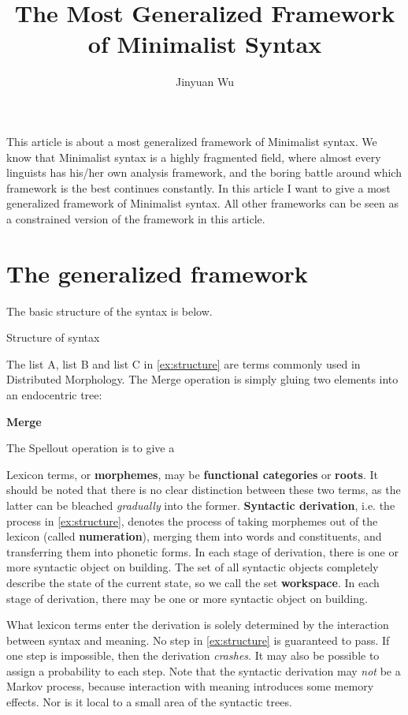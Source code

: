 \documentclass[a4paper]{article}
\title{The Most Generalized Framework of Minimalist Syntax}
\author{Jinyuan Wu}
\newcommand*{\concept}[1]{{\textbf{#1}}}
\begin{document}
\maketitle

This article is about a most generalized framework of Minimalist syntax. We know that Minimalist syntax 
is a highly fragmented field, where almost every linguists has his/her own analysis
framework, and the boring battle around which framework is the best continues constantly.
In this article I want to give a most generalized framework of Minimalist syntax. All other
frameworks can be seen as a constrained version of the framework in this article.

\section{The generalized framework}

The basic structure of the syntax is below.
\begin{exe}
    \ex\label{ex:structure} Structure of syntax 
    
\end{exe}
The list A, list B and list C in \eqref{ex:structure} are terms commonly used in Distributed Morphology.
The Merge operation is simply gluing two elements into an endocentric tree:
\begin{exe}
    \ex\label{ex:merge} \concept{Merge} 
    
\end{exe}
The Spellout operation is to give a %

Lexicon terms, or \concept{morphemes}, may be \concept{functional categories} or \concept{roots}. 
It should be noted that there is no clear distinction between these two terms, as the latter 
can be bleached \emph{gradually} into the former. \concept{Syntactic derivation}, i.e. the process in \eqref{ex:structure}, denotes the process of taking morphemes out of the lexicon (called \concept{numeration}), merging them into words and constituents, and transferring them into phonetic forms. 
In each stage of derivation, there is one or more syntactic object on building.
The set of all syntactic objects completely describe the state of the current state, so we call the set \concept{workspace}.
In each stage of derivation, there may be one or more syntactic object on building.

What lexicon terms enter the derivation is solely determined by the interaction between syntax and meaning. 
No step in \eqref{ex:structure} is guaranteed to pass. If one step is impossible, then the derivation 
\emph{crashes}. It may also be possible to assign a probability to each step. Note that the syntactic derivation
may \emph{not} be a Markov process, because interaction with meaning introduces some memory effects.
Nor is it local to a small area of the syntactic trees.
\end{document}
